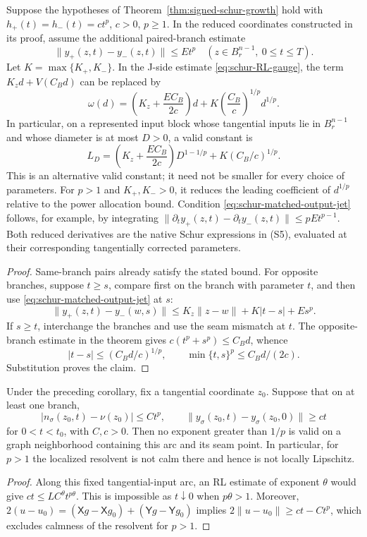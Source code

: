 \begin{proposition}
\label{prop:schur-matched-jet}
Suppose the hypotheses of Theorem~\ref{thm:signed-schur-growth} hold
with \(h_+(t)=h_-(t)=ct^p\), \(c>0\), \(p\ge1\).
In the reduced coordinates constructed in its proof, assume the
additional paired-branch estimate
\[
 \|y_+(z,t)-y_-(z,t)\|\le Et^p
 \quad(z\in B_r^{n-1},\ 0\le t\le T).
 \tag{S16}\label{eq:schur-matched-output-jet}
\]
Let \(K=\max\{K_+,K_-\}\).  In the J-side estimate
\eqref{eq:schur-RL-gauge}, the term \(K_zd+V(C_Bd)\) can be replaced by
\[
 \omega(d)=\left(K_z+\frac{EC_B}{2c}\right)d
       +K\left(\frac{C_B}{c}\right)^{1/p}d^{1/p}.
 \tag{S17}\label{eq:schur-matched-modulus}
\]
In particular, on a represented input block whose tangential inputs lie in
\(B_r^{n-1}\) and whose diameter is at most \(D>0\), a valid constant is
\[
 L_D=\left(K_z+\frac{EC_B}{2c}\right)D^{1-1/p}
           +K(C_B/c)^{1/p}.
\]
This is an alternative valid constant; it need not be smaller for every
choice of parameters.  For \(p>1\) and \(K_+,K_->0\), it reduces the
leading coefficient of \(d^{1/p}\) relative to the power allocation bound.
Condition \eqref{eq:schur-matched-output-jet} follows, for example,
by integrating
\(\|\partial_ty_+(z,t)-\partial_ty_-(z,t)\|\le pEt^{p-1}\).
Both reduced derivatives are the native Schur expressions in (S5),
evaluated at their corresponding tangentially corrected parameters.
\end{proposition}
\begin{proof}
Same-branch pairs already satisfy the stated bound.  For opposite
branches, suppose \(t\ge s\), compare first on the branch with parameter
\(t\), and then use \eqref{eq:schur-matched-output-jet} at \(s\):
\[
 \|y_+(z,t)-y_-(w,s)\|
 \le K_z\|z-w\|+K|t-s|+Es^p.
\]
If \(s\ge t\), interchange the branches and use the seam mismatch at
\(t\).  The opposite-branch estimate in the theorem gives
\(c(t^p+s^p)\le C_Bd\), whence
\[
 |t-s|\le(C_Bd/c)^{1/p},\qquad
 \min\{t,s\}^p\le C_Bd/(2c).
\]
Substitution proves the claim.
\end{proof}

\begin{proposition}
\label{prop:schur-sharp-exponent}
Under the preceding corollary, fix a tangential coordinate \(z_0\).
Suppose that on at least one branch,
\[
 |n_\sigma(z_0,t)-\nu(z_0)|\le Ct^p,\qquad
 \|y_\sigma(z_0,t)-y_\sigma(z_0,0)\|\ge ct
\]
for \(0<t<t_0\), with \(C,c>0\).  Then no exponent greater than
\(1/p\) is valid on a graph neighborhood containing this arc and its
seam point.  In particular, for \(p>1\) the localized resolvent is not
calm there and hence is not locally Lipschitz.
\end{proposition}
\begin{proof}
Along this fixed tangential-input arc, an RL estimate of exponent
\(\theta\) would give \(ct\le LC^\theta t^{p\theta}\).
This is impossible as \(t\downarrow0\) when \(p\theta>1\).  Moreover,
\(2(u-u_0)=(\mathsf Xg-\mathsf Xg_0)+(\mathsf Yg-\mathsf Yg_0)\)
implies \(2\|u-u_0\|\ge ct-Ct^p\), which excludes calmness of the
resolvent for \(p>1\).
\end{proof}

